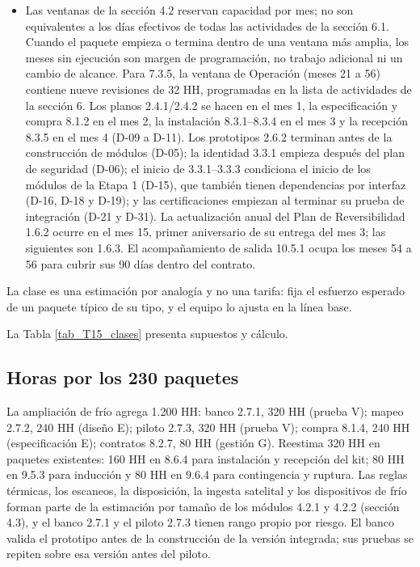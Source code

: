 \begin{itemize}
\item Las ventanas de la sección 4.2 reservan capacidad por mes; no son equivalentes a los días efectivos de todas las actividades de la sección 6.1. Cuando el paquete empieza o termina dentro de una ventana más amplia, los meses sin ejecución son margen de programación, no trabajo adicional ni un cambio de alcance. Para 7.3.5, la ventana de Operación (meses 21 a 56) contiene nueve revisiones de 32 HH, programadas en la lista de actividades de la sección 6.
Los planos 2.4.1/\allowbreak{}2.4.2 se hacen en el mes 1, la especificación y compra 8.1.2 en el mes 2, la instalación 8.3.1–8.3.4 en el mes 3 y la recepción 8.3.5 en el mes 4 (D-09 a D-11). Los prototipos 2.6.2 terminan antes de la construcción de módulos (D-05); la identidad 3.3.1 empieza después del plan de seguridad (D-06); el inicio de 3.3.1–3.3.3 condiciona el inicio de los módulos de la Etapa 1 (D-15), que también tienen dependencias por interfaz (D-16, D-18 y D-19); y las certificaciones empiezan al terminar su prueba de integración (D-21 y D-31). La actualización anual del Plan de Reversibilidad 1.6.2 ocurre en el mes 15, primer aniversario de su entrega del mes 3; las siguientes son 1.6.3. El acompañamiento de salida 10.5.1 ocupa los meses 54 a 56 para cubrir sus 90 días dentro del contrato.

\end{itemize}
La clase es una estimación por analogía y no una tarifa: fija el esfuerzo esperado de un paquete típico de su tipo, y el equipo lo ajusta en la línea base.

La Tabla \ref{tab_T15_clases} presenta supuestos y cálculo.


\subsection{Horas por los 230 paquetes}

La ampliación de frío agrega 1.200 HH: banco 2.7.1, 320 HH (prueba V); mapeo 2.7.2, 240 HH (diseño E); piloto 2.7.3, 320 HH (prueba V); compra 8.1.4, 240 HH (especificación E); contratos 8.2.7, 80 HH (gestión G). Reestima 320 HH en paquetes existentes: 160 HH en 8.6.4 para instalación y recepción del kit; 80 HH en 9.5.3 para inducción y 80 HH en 9.6.4 para contingencia y ruptura. Las reglas térmicas, los escaneos, la disposición, la ingesta satelital y los dispositivos de frío forman parte de la estimación por tamaño de los módulos 4.2.1 y 4.2.2 (sección 4.3), y el banco 2.7.1 y el piloto 2.7.3 tienen rango propio por riesgo. El banco valida el prototipo antes de la construcción de la versión integrada; sus pruebas se repiten sobre esa versión antes del piloto.

